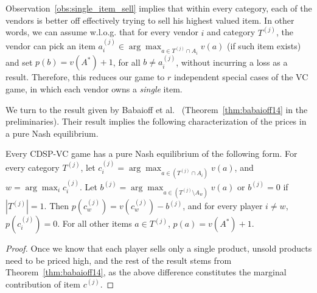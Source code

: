 Observation~\ref{obs:single_item_sell} implies that within every category, each of the vendors is better off effectively trying to sell his highest valued item. In other words, we can assume w.l.o.g. that for every vendor $i$ and category $T^{(j)}$, the vendor can pick an item $a^{(j)}_{i} \in \arg\max_{a \in T^{(j)} \cap A_i}v(a)$ (if such item exists) and set $p(b)=v(A^*)+1$, for all $b \neq a^{(j)}_i$, without incurring a loss as a result. Therefore, this reduces our game to $r$ independent special cases of the VC game, in which each vendor owns a \emph{single} item.

We turn to the result given by Babaioff et al.~\citeyear{BabaioffNL14} (Theorem~\ref{thm:babaioff14} in the preliminaries). Their result implies
the following characterization of the prices in a pure Nash equilibrium. 

\begin{corollary}
Every CDSP-VC game has a pure Nash equilibrium of the following form. For every category $T^{(j)}$, let $c_{i}^{(j)} = \arg\max_{a \in (T^{(j)}\cap A_{i})}v(a)$, and $w=\arg\max_{i} c_{i}^{(j)}$. Let $b^{(j)}=\arg\max_{a \in (T^{(j)}\setminus A_{w})}v(a)$ or $b^{(j)}=0$ if $|T^{(j)}|=1$. Then $p(c_{w}^{(j)})=v(c_{w}^{(j)}) - b^{(j)}$, and for every player $i\neq w$, $p(c_{i}^{(j)})=0$. For all other items $a\in T^{(j)}$, $p(a)=v(A^*)+1$.
\end{corollary}
\begin{proof}
Once we know that each player sells only a single product, unsold products need to be priced high, and the rest of the result stems from Theorem~\ref{thm:babaioff14}, as the above difference constitutes the marginal contribution of item $c^{(j)}$.
\end{proof}

